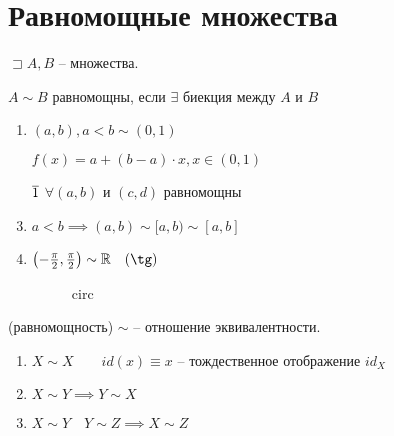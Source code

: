    \section{Равномощные множества}

    \begin{definition}
        $\sqsupset A,B$ -- множества.

        $A\sim B$ равномощны, если $\exists $ биекция между $A$ и $B$
    \end{definition}
    \begin{example}
        \begin{enumerate}
            \item $(a,b), a<b \sim (0,1)$

                $f(x) = a+(b-a)\cdot x, x\in (0,1)$
            \item [$\overline{1}$] $\forall (a,b)$ и $(c,d)$ равномощны
            \item $a<b \implies (a,b)\sim [a,b) \sim [a,b]$
            \item $\left( -\frac{\pi}{2}, \frac{\pi }{2} \right) \sim \R\quad (\tg)$
\begin{figure}[ht]
    \centering
    \caption{circ}
    \label{fig:circ}
\end{figure}
        \end{enumerate}
    \end{example}

    \begin{note}
        (равномощность) $\sim $ -- отношение эквивалентности.

        \begin{enumerate}
            \item $X\sim X\qquad id(x) \equiv x$ -- тождественное отображение $id_X$
            \item $X\sim Y \implies  Y\sim X$
            \item $X\sim Y\quad Y\sim Z \implies X\sim Z$
        \end{enumerate}
    \end{note}

